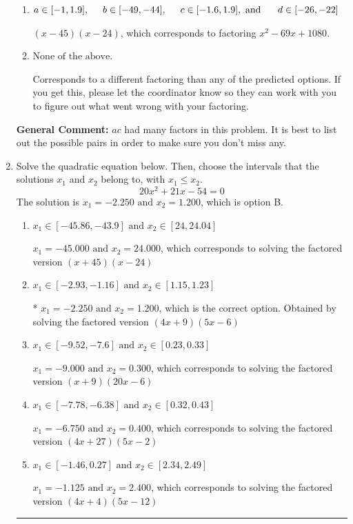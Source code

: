 \documentclass{extbook}[14pt]
\newcommand{\litem}[1]{\item #1

\rule{\textwidth}{0.4pt}}
\begin{document}
\begin{enumerate}
{\begin{enumerate}[label=\Alph*.]
 $(18x -5)(3x -4)$, which corresponds to associating some factor of a to c.
\item \( a \in [-1, 1.9], \hspace*{5mm} b \in [-49, -44], \hspace*{5mm} c \in [-1.6, 1.9], \text{ and } \hspace*{5mm} d \in [-26, -22] \)

 $(x -45)(x -24)$, which corresponds to factoring $x^{2} -69 x + 1080$.
\item \( \text{None of the above.} \)

 Corresponds to a different factoring than any of the predicted options. If you get this, please let the coordinator know so they can work with you to figure out what went wrong with your factoring.
\end{enumerate}

\textbf{General Comment:} $ac$ had many factors in this problem. It is best to list out the possible pairs in order to make sure you don't miss any.
}
\litem{
Solve the quadratic equation below. Then, choose the intervals that the solutions $x_1$ and $x_2$ belong to, with $x_1 \leq x_2$.
\[ 20x^{2} +21 x -54 = 0 \]The solution is \( x_1 = -2.250 \text{ and } x_2 = 1.200 \), which is option B.\begin{enumerate}[label=\Alph*.]
\item \( x_1 \in [-45.86, -43.9] \text{ and } x_2 \in [24, 24.04] \)

$x_1 = -45.000 \text{ and } x_2 = 24.000$, which corresponds to solving the factored version $(x + 45)(x -24)$
\item \( x_1 \in [-2.93, -1.16] \text{ and } x_2 \in [1.15, 1.23] \)

* $x_1 = -2.250 \text{ and } x_2 = 1.200$, which is the correct option. Obtained by solving the factored version $(4x + 9)(5x -6)$
\item \( x_1 \in [-9.52, -7.6] \text{ and } x_2 \in [0.23, 0.33] \)

$x_1 = -9.000 \text{ and } x_2 = 0.300$, which corresponds to solving the factored version $(x + 9)(20x -6)$
\item \( x_1 \in [-7.78, -6.38] \text{ and } x_2 \in [0.32, 0.43] \)

$x_1 = -6.750 \text{ and } x_2 = 0.400$, which corresponds to solving the factored version $(4x + 27)(5x -2)$
\item \( x_1 \in [-1.46, 0.27] \text{ and } x_2 \in [2.34, 2.49] \)

$x_1 = -1.125 \text{ and } x_2 = 2.400$, which corresponds to solving the factored version $(4x + 4)(5x -12)$
\end{enumerate}

}
\end{enumerate}
\end{document}
